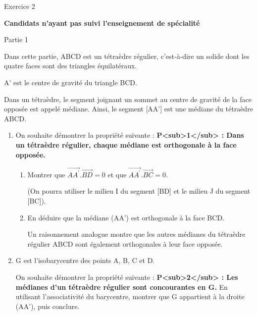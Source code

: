 
%
\begin{h2}Exercice 2\end{h2}
\textbf{Candidats n'ayant pas suivi l'enseignement de spécialité}
\begin{h3}Partie 1\end{h3}
Dans cette partie, ABCD est un tétraèdre régulier, c'est-à-dire un solide dont les quatre faces sont des triangles équilatéraux.

\begin{center}
\end{center}
A' est le centre de gravité du triangle BCD.
\par
Dans un tétraèdre, le segment joignant un sommet au centre de gravité de la face opposée est appelé médiane. Ainsi, le segment [AA'] est une médiane du tétraèdre ABCD.
\begin{enumerate}
     \item
     On souhaite démontrer la propriété suivante :
     \textbf{P<sub>1</sub> : Dans un tétraèdre régulier, chaque médiane est orthogonale à la face opposée.}
     \begin{enumerate}
          \item
          Montrer que $\overrightarrow{AA^{\prime}} . \overrightarrow{BD}=0$ et que $\overrightarrow{AA^{\prime}} . \overrightarrow{BC}=0$.
          \par
          (On pourra utiliser le milieu I du segment [BD] et le milieu J du segment [BC]).
          \item
          En déduire que la médiane (AA') est orthogonale à la face BCD.
          \par
          Un raisonnement analogue montre que les autres médianes du tétraèdre régulier ABCD sont également orthogonales à leur face opposée.
     \end{enumerate}
     \item
     G est l'isobarycentre des points A, B, C et D.
     \par
     On souhaite démontrer la propriété suivante :
     \textbf{P<sub>2</sub> : Les médianes d'un tétraèdre régulier sont concourantes en G.}
     En utilisant l'associativité du barycentre, montrer que G appartient à la droite (AA'), puis conclure.
\end{enumerate}

